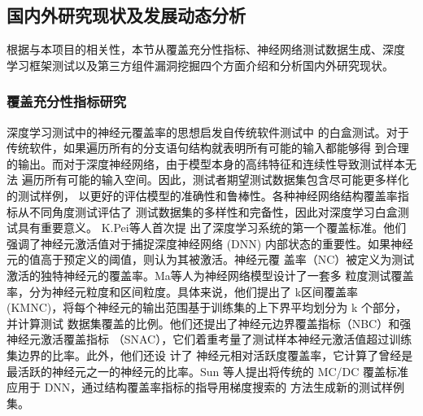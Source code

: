 
\subsection{国内外研究现状及发展动态分析}\label{relatedwork}

根据与本项目的相关性，本节从覆盖充分性指标、神经网络测试数据生成、深度
学习框架测试以及第三方组件漏洞挖掘四个方面介绍和分析国内外研究现状。




\subsubsection{覆盖充分性指标研究}
深度学习测试中的神经元覆盖率的思想启发自传统软件测试中
的白盒测试。对于传统软件，如果遍历所有的分支语句结构就表明所有可能的输入都能够得
到合理的输出。而对于深度神经网络，由于模型本身的高纬特征和连续性导致测试样本无法
遍历所有可能的输入空间。因此，测试者期望测试数据集包含尽可能更多样化的测试样例，
以更好的评估模型的准确性和鲁棒性。各种神经网络结构覆盖率指标从不同角度测试评估了
测试数据集的多样性和完备性，因此对深度学习白盒测试具有重要意义。 K.Pei等人首次提
出了深度学习系统的第一个覆盖标准。他们强调了神经元激活值对于捕捉深度神经网络
(DNN) 内部状态的重要性。如果神经元的值高于预定义的阈值，则认为其被激活。神经元覆
盖率（NC）被定义为测试激活的独特神经元的覆盖率。Ma等人为神经网络模型设计了一套多
粒度测试覆盖率，分为神经元粒度和区间粒度。具体来说，他们提出了 k区间覆盖率
(KMNC)，将每个神经元的输出范围基于训练集的上下界平均划分为 k 个部分，并计算测试
数据集覆盖的比例。他们还提出了神经元边界覆盖指标（NBC）和强神经元激活覆盖指标
（SNAC），它们着重考量了测试样本神经元激活值超过训练集边界的比率。此外，他们还设
计了 神经元相对活跃度覆盖率，它计算了曾经是最活跃的神经元之一的神经元的比率。Sun
等人提出将传统的 MC/DC 覆盖标准应用于 DNN，通过结构覆盖率指标的指导用梯度搜索的
方法生成新的测试样例集。

